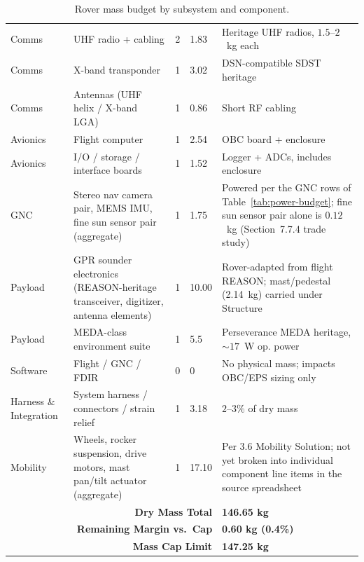 \documentclass[11pt]{article}
\begin{document}
\begin{table}[H]
\begin{tabular}{p{1.7cm}p{4.3cm}p{0.5cm}p{1.2cm}p{5.5cm}}
Comms & UHF radio + cabling & 2 & 1.83 & Heritage UHF radios, $1.5$--$2$~kg each \\
Comms & X-band transponder & 1 & 3.02 & DSN-compatible SDST heritage \\
Comms & Antennas (UHF helix / X-band LGA) & 1 & 0.86 & Short RF cabling \\
Avionics & Flight computer & 1 & 2.54 & OBC board + enclosure \\
Avionics & I/O / storage / interface boards & 1 & 1.52 & Logger + ADCs, includes enclosure \\
GNC & Stereo nav camera pair, MEMS IMU, fine sun sensor pair (aggregate) & 1 & 1.75 & Powered per
the GNC rows of Table~\ref{tab:power-budget}; fine sun sensor pair alone is $0.12$~kg
(Section~7.7.4 trade study) \\
Payload & GPR sounder electronics (REASON-heritage transceiver, digitizer, antenna elements) & 1
& 10.00 & Rover-adapted from flight REASON; mast/pedestal (2.14~kg) carried under Structure \\
Payload & MEDA-class environment suite & 1 & 5.5 & Perseverance MEDA heritage, $\sim 17$~W op.
power \\
Software & Flight / GNC / FDIR & 0 & 0 & No physical mass; impacts OBC/EPS sizing only \\
Harness \& Integration & System harness / connectors / strain relief & 1 & 3.18 &
$2$--$3\%$ of dry mass \\
Mobility & Wheels, rocker suspension, drive motors, mast pan/tilt actuator (aggregate) & 1 &
17.10 & Per 3.6 Mobility Solution; not yet broken into individual component line items in the
source spreadsheet \\
\midrule
\multicolumn{4}{r}{\textbf{Dry Mass Total}} & \textbf{146.65 kg} \\
\multicolumn{4}{r}{\textbf{Remaining Margin vs.\ Cap}} & \textbf{0.60 kg (0.4\%)} \\
\multicolumn{4}{r}{\textbf{Mass Cap Limit}} & \textbf{147.25 kg} \\
\bottomrule
\end{tabular}
\caption{Rover mass budget by subsystem and component.}
\label{tab:mass-budget}
\end{table}
\end{document}
